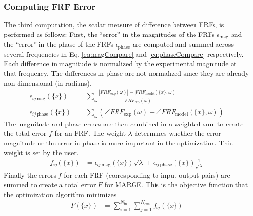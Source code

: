 \subsubsection{Computing FRF Error} %

The third computation, the scalar measure of difference between FRFs, is performed as follows:
First, the ``error'' in the magnitudes of the FRFs $\epsilon_\text{mag}$ and the ``error'' in the phase of the FRFs $\epsilon_\text{phase}$ are computed and summed across several frequencies in Eq. \ref{eq:magCompare} and \ref{eq:phaseCompare} respectively. Each difference in magnitude is normalized by the experimental magnitude at that frequency. The differences in phase are not normalized since they are already non-dimensional (in radians).
\begin{align}
	\label{eq:magCompare}
	\epsilon_{ij \, \text{mag}}(\{x\}) &= \sum_\omega \frac{|FRF_\text{exp} (\omega)| - |FRF_\text{model}(\{x\},\omega)|}{|FRF_\text{exp} (\omega)|} \\
	\label{eq:phaseCompare}
	\epsilon_{ij \, \text{phase}}(\{x\}) &= \sum_\omega \left( \angle FRF_\text{exp} (\omega) - \angle FRF_\text{model}(\{x\},\omega) \right)
\end{align}
The magnitude and phase errors are then combined in a weighted sum to create the total error $f$ for an FRF. The weight $\lambda$ determines whether the error magnitude or the error in phase is more important in the optimization. This weight is set by the user.
\begin{align}
	f_{ij}(\{x\}) &= \epsilon_{ij \, \text{mag}}(\{x\}) \sqrt{\lambda} + \epsilon_{ij \, \text{phase}}(\{x\}) \frac{1}{\sqrt{\lambda}}
\end{align}
Finally the errors $f$ for each FRF (corresponding to input-output pairs) are summed to create a total error $F$ for MARGE. This is the objective function that the optimization algorithm minimizes.
\begin{align}
	F(\{x\}) &= \sum_{i=1}^{N_\text{in}} \sum_{j=1}^{N_\text{out}} f_{ij}(\{x\})
\end{align}

